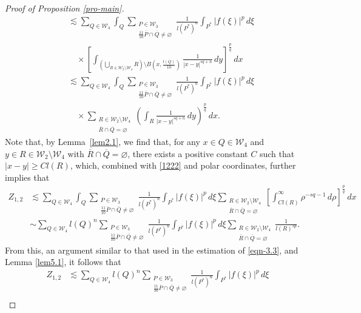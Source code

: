 \documentclass[11pt,twoside]{article}
\def\cw{\mathcal W}
\def\pxing{P^{*}}
\theoremstyle{mylem}
\theoremstyle{definition}
\numberwithin{equation}{section}
\begin{document}
\begin{proof}[Proof of Proposition \ref{pro-main}]
\begin{align}
&\lesssim \sum_{Q\in\cw_4} \int_{Q} \sum_{\substack{P\in\mathcal{W}_3\\ \frac{11}{10}\overline{P}\cap\overline{Q} \neq\varnothing}} \frac{1}{l(\pxing)^n}\int_{P^{*}} |f(\xi)|^p\,d\xi \nonumber \\
&\quad\times\left[ \int_{(\bigcup_{R\in\cw_2\setminus\cw_4}R)\setminus B(x,\frac{l(Q)}{10})} \frac{1}{|x - y|^{s q + n}}\,dy \right]^{\frac{p}{q}}\,dx\nonumber\\
&\lesssim \sum_{Q\in\cw_4} \int_{Q} \sum_{\substack{P\in\mathcal{W}_3\\ \frac{11}{10}\overline{P}\cap\overline{Q} \neq\varnothing}} \frac{1}{l(\pxing)^n}\int_{P^{*}} |f(\xi)|^p\,d\xi\nonumber\\
&\quad\times \sum_{\substack{R\in\mathcal{W}_2\setminus\cw_4 \\ \overline{R}\cap\overline{Q} =\varnothing}}\left( \int_{R} \frac{1}{|x - y|^{s q + n}}\,dy \right)^{\frac{p}{q}}\,dx.
\end{align}
Note that, by Lemma~\ref{lem2.1}, we find that,
for any $x\in Q\in\cw_4$ and $y\in R\in\cw_2\setminus\cw_4$ with $\overline{R}\cap\overline{Q}=\varnothing$, there exists a positive constant $C$ such that $|x-y|\geq Cl(R)$, which,
combined with \eqref{1222} and polar coordinates, further implies that
\begin{align*}
Z_{1,2}&\lesssim\sum_{Q\in\cw_4} \int_{Q} \sum_{\substack{P\in\mathcal{W}_3\\ \frac{11}{10}\overline{P}\cap\overline{Q} \neq\varnothing}} \frac{1}{l(\pxing)^n}\int_{P^{*}} |f(\xi)|^p\,d\xi \sum_{\substack{R\in\mathcal{W}_2\setminus\cw_4 \\ \overline{R}\cap\overline{Q} =\varnothing}}\left[ \int_{Cl(R)}^{\infty} \rho^{-s q-1}\,d\rho  \right]^{\frac{p}{q}}\,dx \\
&\sim \sum_{Q\in\cw_4} l(Q)^n \sum_{\substack{P\in\mathcal{W}_3\\ \frac{11}{10}\overline{P}\cap\overline{Q} \neq\varnothing}} \frac{1}{l(\pxing)^n}\int_{P^{*}} |f(\xi)|^p\,d\xi \sum_{\substack{R\in\mathcal{W}_2\setminus\cw_4 \\ \overline{R}\cap\overline{Q} =\varnothing}} \frac{1}{l(R)^{sp}}.
\end{align*}
From this, an argument similar to that used in the estimation of \eqref{eqn-3.3}, and Lemma \ref{lem5.1}, it follows that
\begin{align}\label{eqn-3.14}
Z_{1,2}&\lesssim \sum_{Q\in\cw_4} l(Q)^n \sum_{\substack{P\in\mathcal{W}_3\\ \frac{11}{10}\overline{P}\cap\overline{Q} \neq\varnothing}} \frac{1}{l(\pxing)^n}\int_{P^{*}} |f(\xi)|^p\,d\xi \nonumber \\

\end{align}
\end{proof}
\end{document}

